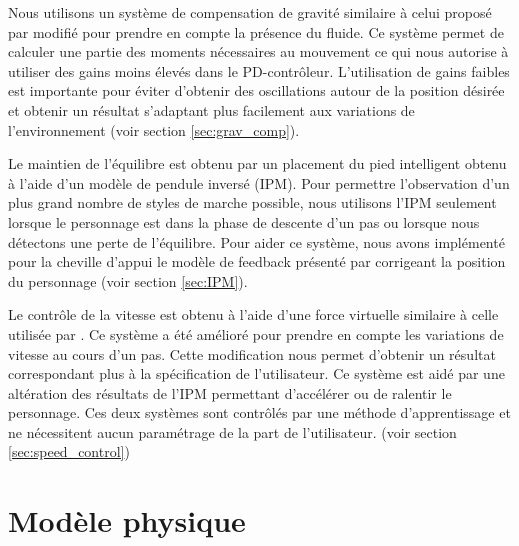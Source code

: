 \documentclass[runningheads,a4paper]{llncs}
\begin{document}
Nous utilisons un système de compensation de gravité similaire à celui proposé par \cite{coros2010generalized} modifié pour prendre en compte la présence du fluide. Ce système permet de calculer une partie des moments nécessaires au mouvement ce qui nous autorise à utiliser des gains moins élevés dans le PD-contrôleur. L'utilisation de gains faibles est importante pour éviter d'obtenir des oscillations autour de la position désirée et obtenir un résultat s'adaptant plus facilement aux variations de l'environnement (voir section \ref{sec:grav_comp}).

Le maintien de l'équilibre est obtenu par un placement du pied intelligent obtenu à l'aide d'un modèle de pendule inversé (IPM). Pour permettre l'observation d'un plus grand nombre de styles de marche possible, nous utilisons l'IPM seulement lorsque le personnage est dans la phase de descente d'un pas ou lorsque nous détectons une perte de l'équilibre. Pour aider ce système, nous avons implémenté pour  la cheville d'appui le modèle de feedback présenté par \cite{yin2007simbicon} corrigeant la position du personnage (voir section \ref{sec:IPM}).

Le contrôle de la vitesse est obtenu à l'aide d'une force virtuelle similaire à celle utilisée par \cite{coros2010generalized}. Ce système a été amélioré pour prendre en compte les variations de vitesse au cours d'un pas. Cette modification nous permet d'obtenir un résultat correspondant plus à la spécification de l'utilisateur. Ce système est aidé par une altération des résultats de l'IPM permettant d'accélérer ou de ralentir le personnage. Ces deux systèmes sont contrôlés par une méthode d'apprentissage et ne nécessitent aucun paramétrage de la part de l'utilisateur. (voir section \ref{sec:speed_control})

%
\section{Modèle physique}
\label{sec:model_physique}
\end{document}
